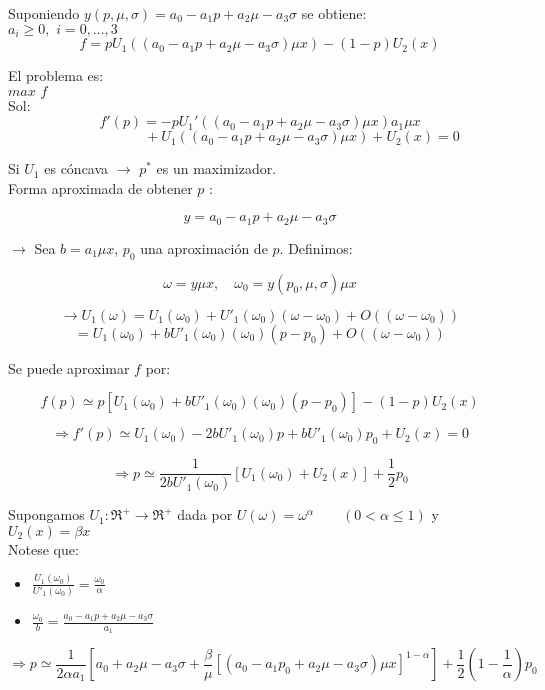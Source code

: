 Suponiendo $y(p,\mu,\sigma)=a_0-a_1p+a_2\mu-a_3\sigma$ se obtiene:\\

$a_i\ge 0,\,\,i=0,...,3$
\[f=pU_1((a_0-a_1p+a_2\mu-a_3\sigma)\mu x)-(1-p)U_2(x)\]

El problema es:\\

$max\,\,f$\\

Sol:\\

\[f'(p)=-pU_1'((a_0-a_1p+a_2\mu-a_3\sigma)\mu x)a_1\mu x\]
\[\qquad\qquad\qquad+U_1((a_0-a_1p+a_2\mu-a_3\sigma)\mu x)+U_2(x)=0\]

Si $U_1$ es cóncava $\rightarrow$ $p^*$ es un maximizador.\\

 Forma aproximada de obtener $p$ :
 
 \[y=a_0-a_1p+a_2\mu-a_3\sigma\]
 
 $\rightarrow$ Sea $b=a_1\mu x$, $p_0$ una aproximación de $p$. Definimos:
 
 \[\omega=y\mu x,\quad \omega_0=y(p_0,\mu,\sigma)\mu x\]
 
 \[\rightarrow U_1(\omega)=U_1(\omega_0)+U'_1(\omega_0)(\omega-\omega_0)+O((\omega-\omega_0))\] 
 \[=U_1(\omega_0)+bU'_1(\omega_0)(\omega_0)(p-p_0)+O((\omega-\omega_0))\]
 
 Se puede aproximar $f$ por:
 
 \[f(p)\simeq p[U_1(\omega_0)+bU'_1(\omega_0)(\omega_0)(p-p_0)]-(1-p)U_2(x)\]
 
 \[\Rightarrow f'(p)\simeq U_1(\omega_0)-2bU'_1(\omega_0)p+bU'_1(\omega_0)p_0+U_2(x)=0\]
 
 \[\Rightarrow p\simeq \frac{1}{2bU'_1(\omega_0)}[U_1(\omega_0)+U_2(x)]+\frac{1}{2}p_0\]
 
Supongamos $U_1:\Re^+ \rightarrow \Re^+$ dada por $U(\omega)=\omega^\alpha\qquad(0<\alpha\le1)$ y $U_2(x)=\beta x$\\

Notese que:
\begin{itemize}
 \item ${\displaystyle\frac{U_1(\omega_0)}{U'_1(\omega_0)}=\frac{\omega_0}{\alpha}}$
 \item ${\displaystyle\frac{\omega_0}{b}=\frac{a_0-a_1p+a_2\mu-a_3\sigma}{a_1}}$
\end{itemize}

\[\Rightarrow p\simeq \frac{1}{2\alpha a_1}[a_0+a_2\mu-a_3\sigma+\frac{\beta}{\mu}[(a_0-a_1p_0+a_2\mu-a_3\sigma)\mu x]^{1-\alpha}]+\frac{1}{2}(1-\frac{1}{\alpha})p_0\]
 
